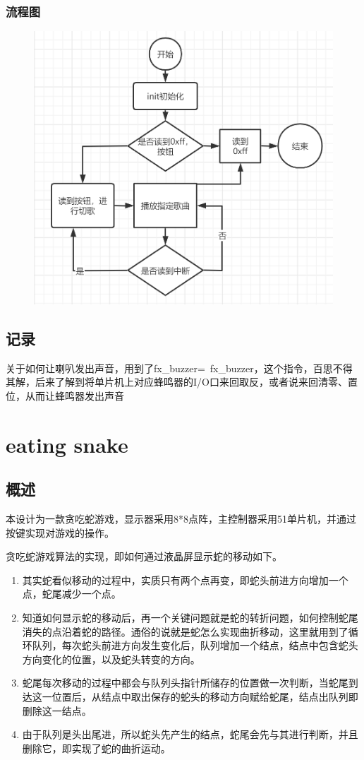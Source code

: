 \documentclass[UTF8]{ctexart}
\begin{document}
    \subsubsection{流程图}
    \begin{figure}[ht]
	\centering
	\includegraphics[scale=0.6]{2.png}
\end{figure}
    \subsection{记录}
    关于如何让喇叭发出声音，用到了fx_buzzer=~fx_buzzer，这个指令，百思不得其解，后来了解到将单片机上对应蜂鸣器的I/O口来回取反，或者说来回清零、置位，从而让蜂鸣器发出声音
    \section{eating snake}
    \subsection{概述}
    本设计为一款贪吃蛇游戏，显示器采用8*8点阵，主控制器采用51单片机，并通过按键实现对游戏的操作。\par
    贪吃蛇游戏算法的实现，即如何通过液晶屏显示蛇的移动如下。
    \begin{enumerate}
      \item 其实蛇看似移动的过程中，实质只有两个点再变，即蛇头前进方向增加一个点，蛇尾减少一个点。
      \item 知道如何显示蛇的移动后，再一个关键问题就是蛇的转折问题，如何控制蛇尾消失的点沿着蛇的路径。通俗的说就是蛇怎么实现曲折移动，这里就用到了循环队列，每次蛇头前进方向发生变化后，队列增加一个结点，结点中包含蛇头方向变化的位置，以及蛇头转变的方向。
      \item 蛇尾每次移动的过程中都会与队列头指针所储存的位置做一次判断，当蛇尾到达这一位置后，从结点中取出保存的蛇头的移动方向赋给蛇尾，结点出队列即删除这一结点。
      \item 由于队列是头出尾进，所以蛇头先产生的结点，蛇尾会先与其进行判断，并且删除它，即实现了蛇的曲折运动。
    \end{enumerate}
\end{document}
